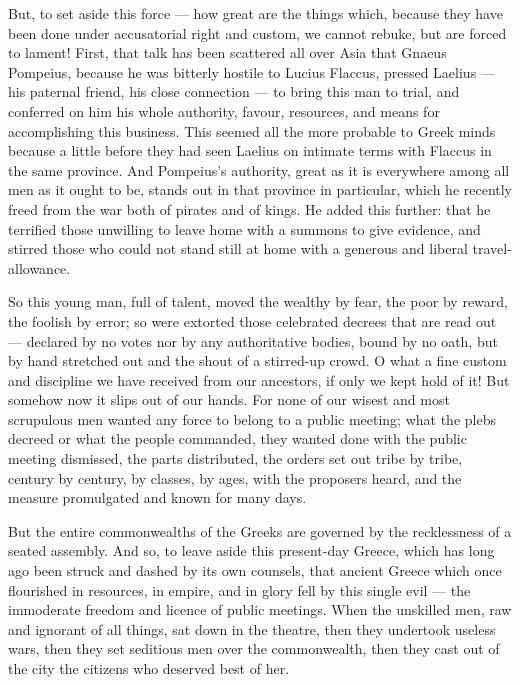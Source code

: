  But, to set aside this force --- how great are the things which, because they have been done under accusatorial right and custom, we cannot rebuke, but are forced to lament! First, that talk has been scattered all over Asia that Gnaeus Pompeius, because he was bitterly hostile to Lucius Flaccus, pressed Laelius --- his paternal friend, his close connection --- to bring this man to trial, and conferred on him his whole authority, favour, resources, and means for accomplishing this business. This seemed all the more probable to Greek minds because a little before they had seen Laelius on intimate terms with Flaccus in the same province. And Pompeius's authority, great as it is everywhere among all men as it ought to be, stands out in that province in particular, which he recently freed from the war both of pirates and of kings. He added this further: that he terrified those unwilling to leave home with a summons to give evidence, and stirred those who could not stand still at home with a generous and liberal travel-allowance.

 So this young man, full of talent, moved the wealthy by fear, the poor by reward, the foolish by error; so were extorted those celebrated decrees that are read out --- declared by no votes nor by any authoritative bodies, bound by no oath, but by hand stretched out and the shout of a stirred-up crowd. O what a fine custom and discipline we have received from our ancestors, if only we kept hold of it! But somehow now it slips out of our hands. For none of our wisest and most scrupulous men wanted any force to belong to a public meeting; what the plebs decreed or what the people commanded, they wanted done with the public meeting dismissed, the parts distributed, the orders set out tribe by tribe, century by century, by classes, by ages, with the proposers heard, and the measure promulgated and known for many days.

 But the entire commonwealths of the Greeks are governed by the recklessness of a seated assembly. And so, to leave aside this present-day Greece, which has long ago been struck and dashed by its own counsels, that ancient Greece which once flourished in resources, in empire, and in glory fell by this single evil --- the immoderate freedom and licence of public meetings. When the unskilled men, raw and ignorant of all things, sat down in the theatre, then they undertook useless wars, then they set seditious men over the commonwealth, then they cast out of the city the citizens who deserved best of her.

